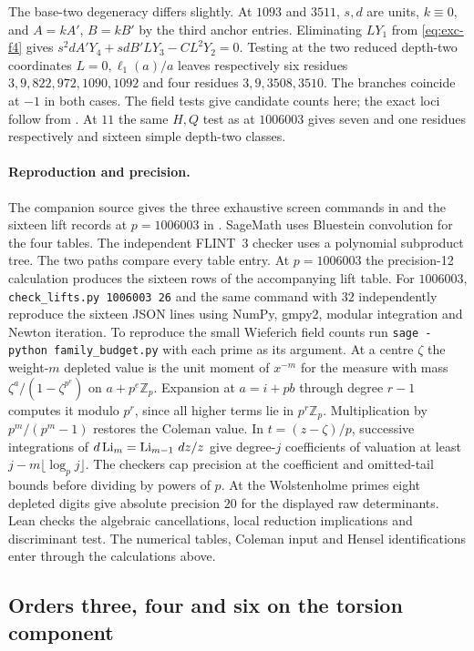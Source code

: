 The base-two degeneracy differs slightly. At $1093$ and $3511$,
$s,d$ are units, $k\equiv0$, and $A=kA'$, $B=kB'$ by the third
anchor entries. Eliminating $LY_1$ from \eqref{eq:exc-f4} gives
$s^2dA'Y_4+sdB'LY_3-CL^2Y_2=0$. Testing at the two reduced
depth-two coordinates $L=0,\ell_1(a)/a$ leaves respectively six
residues $3,9,822,972,1090,1092$ and four residues $3,9,3508,3510$.
The branches coincide at $-1$ in both cases. The field tests give
candidate counts here; the exact loci follow from \cite[Theorem~1.2]{Ludtke}.
At $11$ the same $H,Q$ test as at $1006003$ gives seven and one
residues respectively and sixteen simple depth-two classes.

\paragraph{Reproduction and precision.}
The companion source gives the three exhaustive screen commands in
 and the sixteen lift records at $p=1006003$ in
. SageMath uses Bluestein convolution for
the four tables. The independent FLINT~3 checker uses a polynomial subproduct tree.
The two paths compare every table entry. At \(p=1006003\) the precision-12
calculation produces the sixteen rows of the accompanying lift table.
For $1006003$, \texttt{check\_lifts.py 1006003 26} and the same command
with $32$ independently reproduce the sixteen JSON lines using NumPy,
gmpy2, modular integration and Newton iteration. To reproduce the small
Wieferich field counts run \texttt{sage -python family\_budget.py}
with each prime as its argument. At a centre $\zeta$ the weight-$m$
depleted value is the unit moment of $x^{-m}$ for the measure with
mass $\zeta^a/(1-\zeta^{p^e})$ on $a+p^e\mathbb Z_p$.
Expansion at $a=i+pb$ through degree $r-1$ computes it modulo $p^r$,
since all higher terms lie in $p^r\mathbb Z_p$. Multiplication by
$p^m/(p^m-1)$ restores the Coleman value. In $t=(z-\zeta)/p$,
successive integrations of $d\operatorname{Li}_m=
\operatorname{Li}_{m-1}\,dz/z$ give degree-$j$ coefficients of
valuation at least $j-m\lfloor\log_p j\rfloor$. The checkers cap precision
at the coefficient and omitted-tail bounds before dividing by powers
of $p$. At the Wolstenholme primes eight depleted digits give absolute
precision $20$ for the displayed raw determinants. Lean checks the
algebraic cancellations, local reduction implications and discriminant
test. The numerical tables, Coleman input and Hensel identifications
enter through the calculations above.

\subsection{Orders three, four and six on the torsion component}

